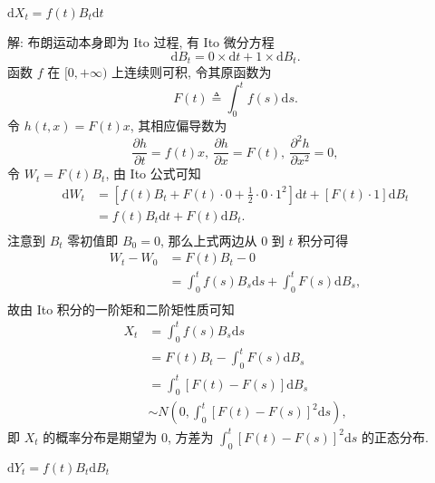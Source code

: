 \documentclass[openany]{ctexbook}
\theoremstyle{kaiti}
\theoremstyle{normal}
\begin{document}
$\mathrm{d}X_t=f(t)B_t\mathrm{d}t$

解: 布朗运动本身即为 Ito 过程, 有 Ito 微分方程
\begin{equation}
  \mathrm{d}B_t=0\times\mathrm{d}t+1\times\mathrm{d}B_t.
\end{equation}
函数 $f$ 在 $[0,+\infty)$ 上连续则可积, 令其原函数为
\begin{equation}
  F(t)\triangleq\int_0^tf(s)\mathrm{d}s.
\end{equation}
令 $h(t,x)=F(t)x$, 其相应偏导数为
\begin{equation}
  \frac{\partial h}{\partial t}=f(t)x,~
  \frac{\partial h}{\partial x}=F(t),~
  \frac{\partial^2 h}{\partial x^2}=0,
\end{equation}
令 $W_t=F(t)B_t$, 由 Ito 公式可知
\begin{equation}
  \begin{aligned}
    \mathrm{d}W_t
    &=\left[f(t)B_t+F(t)\cdot0+\frac{1}{2}\cdot0\cdot1^2\right]\mathrm{d}t+[F(t)\cdot1]\mathrm{d}B_t\\
    &=f(t)B_t\mathrm{d}t+F(t)\mathrm{d}B_t.\\
  \end{aligned}
\end{equation}
注意到 $B_t$ 零初值即 $B_0=0$, 那么上式两边从 $0$ 到 $t$ 积分可得
\begin{equation}
  \begin{aligned}
    W_t-W_0
    &=F(t)B_t-0\\
    &=\int_0^tf(s)B_s\mathrm{d}s+\int_0^tF(s)\mathrm{d}B_s,\\
  \end{aligned}
\end{equation}
故由 Ito 积分的一阶矩和二阶矩性质可知
\begin{equation}
  \begin{aligned}
  X_t
  &=\int_0^tf(s)B_s\mathrm{d}s\\
  &=F(t)B_t-\int_0^tF(s)\mathrm{d}B_s\\
  &=\int_0^t[F(t)-F(s)]\mathrm{d}B_s\\
  &\sim N\left(0,\int_0^t[F(t)-F(s)]^2\mathrm{d}s\right),
  \end{aligned}
\end{equation}
即 $X_t$ 的概率分布是期望为 $0$, 方差为 $\displaystyle\int_0^t[F(t)-F(s)]^2\mathrm{d}s$ 的正态分布.

$\mathrm{d}Y_t=f(t)B_t\mathrm{d}B_t$
\end{document}

